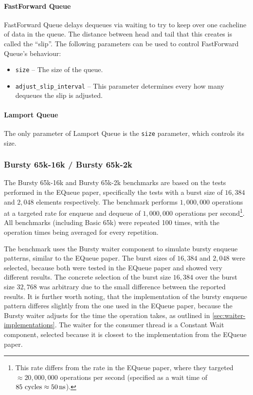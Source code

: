 \paragraph{FastForward Queue}
FastForward Queue delays dequeues via waiting to try to keep over one cacheline of data in the queue\cite{FastForward}.
The distance between head and tail that this creates is called the ``slip''.
The following parameters can be used to control FastForward Queue's behaviour:
\begin{itemize}
    \item \texttt{size} -- The size of the queue.
    \item \texttt{adjust\_slip\_interval} -- This parameter determines every how many dequeues the slip is adjusted.
\end{itemize}

\paragraph{Lamport Queue}
The only parameter of Lamport Queue is the \texttt{size} parameter, which controls its size\cite{Lamport}.

\subsubsection{Bursty 65k-16k / Bursty 65k-2k}
\label{sec:bench-bursty-65k-16k}

The Bursty 65k-16k and Bursty 65k-2k benchmarks are based on the tests performed in the EQueue paper,
specifically the tests with a burst size of $16,384$ and $2,048$ elements respectively.
The benchmark performs $1,000,000$ operations at a targeted rate for enqueue and dequeue of $1,000,000$
operations per second\footnote{This rate differs from the rate in the EQueue paper, where they targeted
    $\approx 20,000,000$ operations per second (specified as a wait time of $85\text{ cycles}\approx \SI{50}{\nano\second}$).
}.
All benchmarks (including Basic 65k) were repeated 100 times, with the operation times being averaged for
every repetition.

The benchmark uses the Bursty waiter component to simulate bursty enqueue patterns, similar to the EQueue paper.
The burst sizes of $16,384$ and $2,048$ were selected, because both were tested in the EQueue paper and showed
very different results.
The concrete selection of the burst size $16,384$ over the burst size $32,768$ was arbitrary due to the small
difference between the reported results.
It is further worth noting, that the implementation of the bursty enqueue pattern differes slightly from the
one used in the EQueue paper, because the Bursty waiter adjusts for the time the operation takes, as outlined
in \autoref{sec:waiter-implementations}.
The waiter for the consumer thread is a Constant Wait component, selected because it is closest to the
implementation from the EQueue paper.

